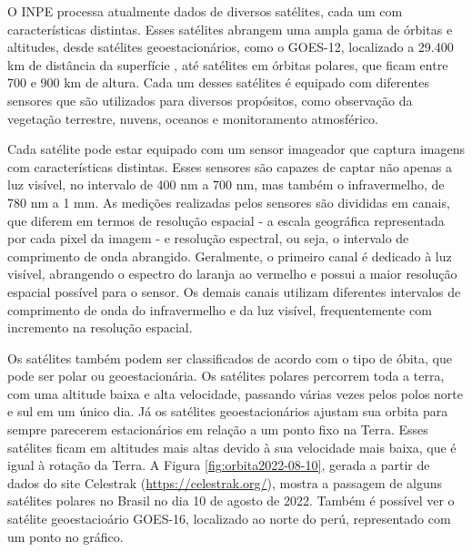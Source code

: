 \documentclass[cic,tc]{iiufrgs}
\begin{document}
O INPE processa atualmente dados de diversos satélites, cada um com características distintas. Esses satélites abrangem uma ampla gama de órbitas e altitudes, desde satélites geoestacionários, como o GOES-12, localizado a 29.400 km de distância da superfície \citep{GOES12Algo}, até satélites em órbitas polares, que ficam entre 700 e 900 km de altura. Cada um desses satélites é equipado com diferentes sensores que são utilizados para diversos propósitos, como observação da vegetação terrestre, nuvens, oceanos e monitoramento atmosférico. \par

Cada satélite pode estar equipado com um sensor imageador que captura imagens com características distintas. Esses sensores são capazes de captar não apenas a luz visível, no intervalo de 400 nm a 700 nm, mas também o infravermelho, de 780 nm a 1 mm. As medições realizadas pelos sensores são divididas em canais, que diferem em termos de resolução espacial - a escala geográfica representada por cada pixel da imagem - e resolução espectral, ou seja, o intervalo de comprimento de onda abrangido. Geralmente, o primeiro canal é dedicado à luz visível, abrangendo o espectro do laranja ao vermelho e possui a maior resolução espacial possível para o sensor. Os demais canais utilizam diferentes intervalos de comprimento de onda do infravermelho e da luz visível, frequentemente com incremento na resolução espacial. \par

Os satélites também podem ser classificados de acordo com o tipo de óbita, que pode ser polar ou geoestacionária. Os satélites polares percorrem toda a terra, com uma altitude baixa e alta velocidade, passando várias vezes pelos polos norte e sul em um único dia. Já os satélites geoestacionários ajustam sua orbita para sempre parecerem estacionários em relação a um ponto fixo na Terra. Esses satélites ficam em altitudes mais altas devido à sua velocidade mais baixa, que é igual à rotação da Terra. A Figura \ref{fig:orbita2022-08-10}, gerada a partir de dados do site Celestrak (\url{https://celestrak.org/}), mostra a passagem de alguns satélites polares no Brasil no dia 10 de agosto de 2022. Também é possível ver o satélite geoestacioário GOES-16, localizado ao norte do perú, representado com um ponto no gráfico. \par
\end{document}
